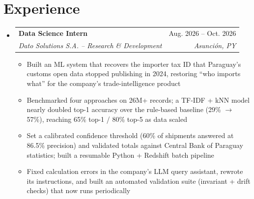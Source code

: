 \documentclass[letterpaper,11pt]{article}
\makeatletter
\newcommand{\resumeItem}[1]{
  \item\small{
    {#1 \vspace{-2pt}}
  }
}
\newcommand{\resumeSubheading}[4]{
  \vspace{-2pt}\item
    \begin{tabular*}{0.97\textwidth}[t]{l@{\extracolsep{\fill}}r}
      \textbf{#1} & #2 \\
      \textit{\small#3} & \textit{\small #4} \\
    \end{tabular*}\vspace{-7pt}
}
\newcommand{\resumeSubHeadingListStart}{\begin{itemize}[leftmargin=0.15in, label={}]}
\newcommand{\resumeSubHeadingListEnd}{\end{itemize}}
\newcommand{\resumeItemListStart}{\begin{itemize}}
\newcommand{\resumeItemListEnd}{\end{itemize}\vspace{-5pt}}
\makeatother
\begin{document}
\section{Experience}
  \resumeSubHeadingListStart
    \resumeSubheading
      {Data Science Intern}{Aug. 2026 -- Oct. 2026}
      {Dato Solutions S.A. -- Research \& Development}{Asunción, PY}
      \resumeItemListStart
        \resumeItem{Built an ML system that recovers the importer tax ID that Paraguay's customs open data stopped publishing in 2024, restoring ``who imports what'' for the company's trade-intelligence product}
        \resumeItem{Benchmarked four approaches on 26M+ records; a TF-IDF + kNN model nearly doubled top-1 accuracy over the rule-based baseline (29\% $\rightarrow$ 57\%), reaching 65\% top-1 / 80\% top-5 as data scaled}
        \resumeItem{Set a calibrated confidence threshold (60\% of shipments answered at 86.5\% precision) and validated totals against Central Bank of Paraguay statistics; built a resumable Python + Redshift batch pipeline}
        \resumeItem{Fixed calculation errors in the company's LLM query assistant, rewrote its instructions, and built an automated validation suite (invariant + drift checks) that now runs periodically}
      \resumeItemListEnd
  \resumeSubHeadingListEnd

\end{document}
